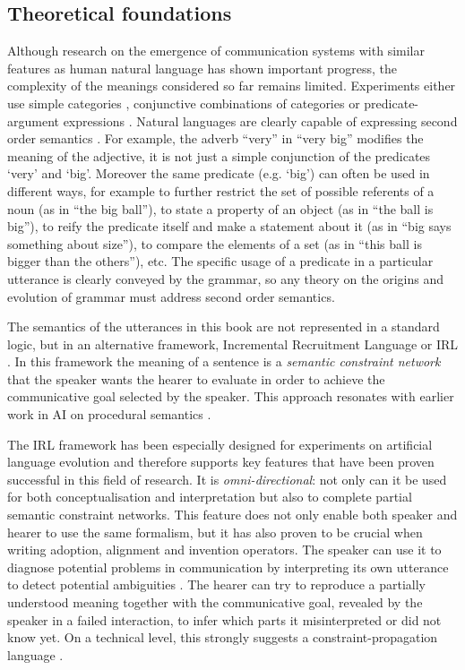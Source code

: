 \subsection{Theoretical foundations}

Although research on the emergence of communication systems with
similar features as human natural language has shown important
progress, the complexity of the meanings considered so far remains
limited. Experiments either use simple categories
\citep{steels05coordinating, belpaeme05explaining}, conjunctive
combinations of categories \citep{wellens08flexible} or
predicate-argument expressions \citep{batali02negotiation,
  smith03iterated, debeule08emergence}. Natural languages are clearly
capable of expressing second order semantics
\citep{dowty1981introduction}. For example, the adverb ``very'' in
``very big'' modifies the meaning of the adjective, it is not just a
simple conjunction of the predicates `very' and `big'. Moreover the
same predicate (e.g. `big') can often be used in different ways, for
example to further restrict the set of possible referents of a noun
(as in ``the big ball''), to state a property of an object (as in
``the ball is big''), to reify the predicate itself and make a
statement about it (as in ``big says something about size''), to
compare the elements of a set (as in ``this ball is bigger than the
others''), etc. The specific usage of a predicate in a particular
utterance is clearly conveyed by the grammar, so any theory on the
origins and evolution of grammar must address second order semantics.

The semantics of the utterances in this book are not represented in
a standard logic, but in an alternative framework, Incremental
Recruitment Language or IRL \citep{steels00emergence,
  steels05planning, vandenbroeck07constraintbased,
  vandenbroeck08constraintbased}. In this framework the meaning of a
sentence is a \emph{semantic constraint network} that the speaker
wants the hearer to evaluate in order to achieve the communicative
goal selected by the speaker. This approach resonates with earlier
work in AI on procedural semantics \citep{winograd72understanding}.

The IRL framework has been especially designed for experiments on
artificial language evolution and therefore supports key features that
have been proven successful in this field of research. It is
\emph{omni-directional}: not only can it be used for both
conceptualisation and interpretation but also to complete partial
semantic constraint networks. This feature does not only enable both
speaker and hearer to use the same formalism, but it has also proven
to be crucial when writing adoption, alignment and invention
operators. The speaker can use it to diagnose potential problems in
communication by interpreting its own utterance to detect potential
ambiguities \citep{steels03reentrance}. The hearer can try to
reproduce a partially understood meaning together with the
communicative goal, revealed by the speaker in a failed interaction,
to infer which parts it misinterpreted or did not know yet. On a
technical level, this strongly suggests a constraint-propagation
language \citep{marriott98programming}.

